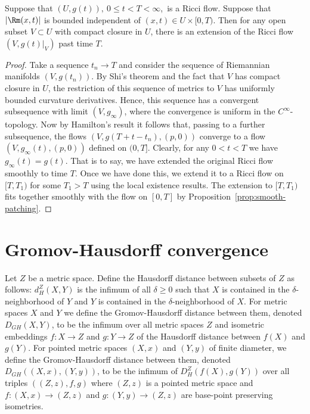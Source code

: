 \begin{corollary}\label{cor:ricci-flow-extension-bounded-curvature}

Suppose that $(U,g(t)),\ 0\le t<T<\infty$,\ is a Ricci flow. Suppose
that $|\Rm(x,t)|$ is bounded independent of $(x,t)\in U\times
[0,T)$. Then for any open subset $V\subset U$ with compact closure
in $U$, there is an extension of the Ricci flow $(V,g(t)|_V)$ past
time $T$.
\end{corollary}

\begin{proof}
\sketch
{}
 Take a sequence $t_n\rightarrow T$ and consider the
sequence of Riemannian manifolds $(V,g(t_n))$. By Shi's theorem and the fact
that $V$ has compact closure in $U$, the restriction of this sequence of
metrics to $V$ has uniformly bounded curvature derivatives. Hence, this
sequence has a convergent subsequence with limit $(V,g_\infty)$, where the
convergence is uniform in the $C^\infty$-topology. Now by Hamilton's result
\cite{Hamiltonlimits} it follows that, passing to a further subsequence, the
flows $(V,g(T+t-t_n),(p,0))$ converge to a flow $(V,g_\infty(t),(p,0))$ defined
on $(0,T]$. Clearly, for any $0<t<T$ we have $g_\infty(t)=g(t)$. That is to
say, we have extended the original Ricci flow smoothly to time $T$. Once we
have done this, we extend it to a Ricci flow on $[T,T_1)$ for some $T_1> T$
using the local existence results. The extension to $[T,T_1)$ fits together
smoothly with the flow on $[0,T]$ by Proposition~\ref{prop:smooth-patching}.
\end{proof}




\section{Gromov-Hausdorff convergence}

Let $Z$ be a metric space. Define the
Hausdorff distance between subsets of $Z$ as follows: $d^Z_H(X,Y)$ is the
infimum of all $\delta\ge 0$ such that $X$ is contained in the
$\delta$-neighborhood of $Y$ and $Y$ is contained in the $\delta$-neighborhood
of $X$. For metric spaces $X$ and $Y$ we define the Gromov-Hausdorff distance
between them, denoted $D_{GH}(X,Y)$, to be the infimum over all metric spaces
$Z$ and isometric embeddings $f\colon X\to Z$ and $g\colon Y\to Z$ of the
Hausdorff distance between $f(X)$ and $g(Y)$. For pointed metric spaces $(X,x)$
and $(Y,y)$ of finite diameter, we define the Gromov-Hausdorff
distance between them, denoted
$D_{GH}((X,x),(Y,y))$, to be the infimum of $D_H^Z(f(X),g(Y))$ over all triples
$((Z,z),f,g)$ where $(Z,z)$ is a pointed metric space and $f\colon (X,x)\to
(Z,z)$ and $g\colon (Y,y)\to (Z,z)$ are base-point preserving isometries.


